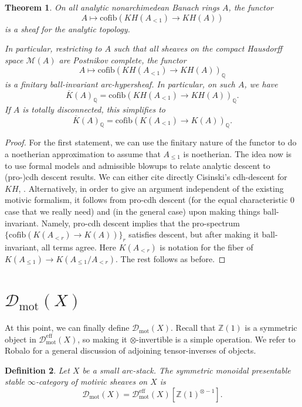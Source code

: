 \documentclass[11pt]{amsart}
\numberwithin{equation}{section}
\newtheorem{theorem}{Theorem}
\numberwithin{theorem}{section}
\newtheorem{definition}[theorem]{Definition}
\theoremstyle{definition}
\begin{document}
\begin{theorem} On all analytic nonarchimedean Banach rings $A$, the functor
\[
A\mapsto \mathrm{cofib}(KH(A_{<1})\to KH(A))
\]
is a sheaf for the analytic topology.

In particular, restricting to $A$ such that all sheaves on the compact Hausdorff space $\mathcal M(A)$ are Postnikov complete, the functor
\[
A\mapsto \mathrm{cofib}(KH(A_{<1})\to KH(A))_{\mathbb Q}
\]
is a finitary ball-invariant arc-hypersheaf. In particular, on such $A$, we have
\[
\overline{K}(A)_{\mathbb Q} = \mathrm{cofib}(KH(A_{<1})\to KH(A))_{\mathbb Q}.
\]
If $A$ is totally disconnected, this simplifies to
\[
\overline{K}(A)_{\mathbb Q} = \mathrm{cofib}(K(A_{<1})\to K(A))_{\mathbb Q}.
\]
\end{theorem}

\begin{proof} For the first statement, we can use the finitary nature of the functor to do a noetherian approximation to assume that $A_{\leq 1}$ is noetherian. The idea now is to use formal models and admissible blowups to relate analytic descent to (pro-)cdh descent results. We can either cite directly Cisinski's cdh-descent for $KH$, \cite{Cisinski}. Alternatively, in order to give an argument independent of the existing motivic formalism, it follows from pro-cdh descent \cite[Theorem 3.7]{MorrowProCdh} (for the equal characteristic $0$ case that we really need) and \cite[Theorem A]{ProCdh} (in the general case) upon making things ball-invariant. Namely, pro-cdh descent implies that the pro-spectrum $\{\mathrm{cofib}(K(A_{<r})\to K(A))\}_r$ satisfies descent, but after making it ball-invariant, all terms agree. Here $K(A_{<r})$ is notation for the fiber of $K(A_{\leq 1})\to K(A_{\leq 1}/A_{<r})$. The rest follows as before.
\end{proof}

\section{$\mathcal D_{\mathrm{mot}}(X)$}

At this point, we can finally define $\mathcal D_{\mathrm{mot}}(X)$. Recall that $\mathbb Z(1)$ is a symmetric object in $\mathcal D_{\mathrm{mot}}^{\mathrm{eff}}(X)$, so making it $\otimes$-invertible is a simple operation. We refer to Robalo \cite[Section 2.1]{Robalo} for a general discussion of adjoining tensor-inverses of objects.

\begin{definition} Let $X$ be a small arc-stack. The symmetric monoidal presentable stable $\infty$-category of motivic sheaves on $X$ is
\[
\mathcal D_{\mathrm{mot}}(X) = \mathcal D_{\mathrm{mot}}^{\mathrm{eff}}(X)[\mathbb Z(1)^{\otimes -1}].
\]
\end{definition}
\end{document}
